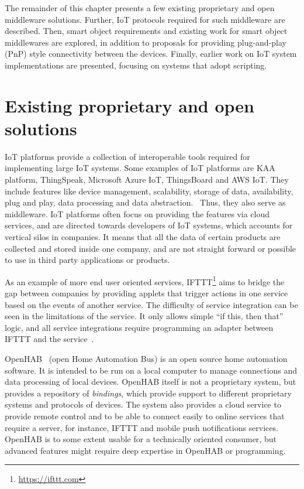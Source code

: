The remainder of this chapter presents a few
existing proprietary and open middleware solutions.
Further,
IoT protocols required for such middleware are described.
Then, 
smart object requirements and existing work for smart object middlewares are explored, in addition to proposals for providing plug-and-play (PnP) style connectivity between the devices.
Finally,
earlier work on IoT system implementations are presented, focusing on systems that adopt scripting.



\section{Existing proprietary and open solutions}


IoT platforms provide a collection of interoperable tools required for implementing large IoT systems. Some examples of IoT platforms are KAA platform, ThingSpeak, Microsoft Azure IoT, ThingsBoard and AWS IoT. They include features like device management, scalability, storage of data, availability, plug and play, data processing and data abstraction.~\cite{A_Survey_of_IoT_Platform_Comparison_for_Building_Cyber-Physical_System_Architecture} Thus, they also serve as middleware. IoT platforms often focus on providing the features via cloud services, and are directed towards developers of IoT systems, which accounts for vertical silos in companies. It means that all the data of certain products are collected and stored inside one company, and are not straight forward or possible to use in third party applications or products. %

As an example of more end user oriented services,
IFTTT\footnote{\url{https://ifttt.com}} aims to bridge the gap between companies by providing applets that trigger actions in one service based on the events of another service. The difficulty of service integration can be seen in the limitations of the service. It only allows simple ``if this, then that'' logic, and all service integrations require programming an adapter between IFTTT and the service~\cite{ifttt_docs}.

OpenHAB~\cite{openhab} (open Home Automation Bus) is an open source home automation software. It is intended to be run on a local computer to manage connections and data processing of local devices. OpenHAB itself is not a proprietary system, but provides a repository of \emph{bindings}, which provide support to different proprietary systems and protocols of devices. The system also provides a cloud service to provide remote control and to be able to connect easily to online services that require a server, for instance, IFTTT and mobile push notifications services. OpenHAB is to some extent usable for a technically oriented consumer, but advanced features might require deep expertise in OpenHAB or programming.

